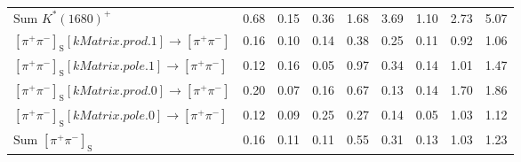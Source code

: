 \begin{tabular}{l  c  c  c  c  c  c  c  | c }
$\text{Sum } K^{*}(1680)^{+}$ & 0.68 & 0.15 & 0.36 & 1.68 & 3.69 & 1.10 & 2.73 & 5.07 \\ 
$\left[\pi^{+}\pi^{-}\right]_{\text{S}}\left[kMatrix.prod.1\right]\rightarrow \left[\pi^{+}\pi^{-}\right]$ & 0.16 & 0.10 & 0.14 & 0.38 & 0.25 & 0.11 & 0.92 & 1.06 \\ 
$\left[\pi^{+}\pi^{-}\right]_{\text{S}}\left[kMatrix.pole.1\right]\rightarrow \left[\pi^{+}\pi^{-}\right]$ & 0.12 & 0.16 & 0.05 & 0.97 & 0.34 & 0.14 & 1.01 & 1.47 \\ 
$\left[\pi^{+}\pi^{-}\right]_{\text{S}}\left[kMatrix.prod.0\right]\rightarrow \left[\pi^{+}\pi^{-}\right]$ & 0.20 & 0.07 & 0.16 & 0.67 & 0.13 & 0.14 & 1.70 & 1.86 \\ 
$\left[\pi^{+}\pi^{-}\right]_{\text{S}}\left[kMatrix.pole.0\right]\rightarrow \left[\pi^{+}\pi^{-}\right]$ & 0.12 & 0.09 & 0.25 & 0.27 & 0.14 & 0.05 & 1.03 & 1.12 \\ 
$\text{Sum } \left[\pi^{+}\pi^{-}\right]_{\text{S}}$ & 0.16 & 0.11 & 0.11 & 0.55 & 0.31 & 0.13 & 1.03 & 1.23 \\ 
\hline
\hline
\end{tabular}
